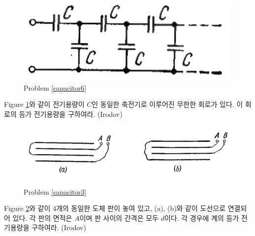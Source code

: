\begin{figure}[h]
\centering\includegraphics[scale=0.4]{Pictures/capacitor6.PNG}
\caption{Problem \ref{capacitor6}}
\label{fig:capacitor6}
\end{figure}
\begin{exercise}\label{capacitor6}

Figure \ref{fig:capacitor6}와 같이 전기용량이 $C$인 동일한 축전기로 이루어진 무한한 회로가 있다. 이 회로의 등가 전기용량을 구하여라.  (Irodov)
\end{exercise}

\begin{problem}\label{capacitor3}

\begin{figure}[h]
\centering\includegraphics[scale=0.4]{Pictures/capacitor3.PNG}
\label{fig:capacitor3}
\caption{Problem \ref{capacitor3}}

\end{figure}
Figure \ref{fig:capacitor3}와 같이 4개의 동일한 도체 판이 놓여 있고, (a), (b)와 같이 도선으로 연결되어 있다. 각 판의 면적은 $A$이며 판 사이의 간격은 모두 $d$이다. 각 경우에 계의 등가 전기용량을 구하여라. (Irodov)
\end{problem}


